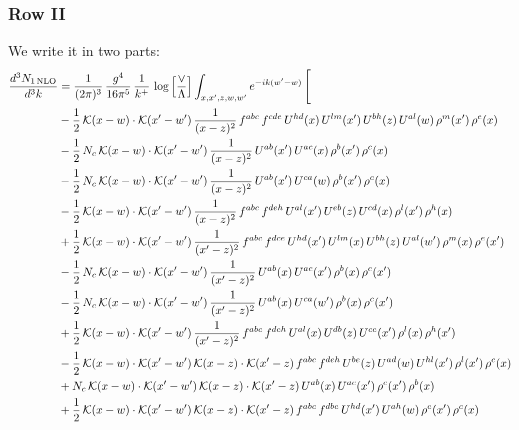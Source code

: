 \documentclass[9pt]{article}
\numberwithin{equation}{section}
\begin{document}
\subsubsection{Row II}
We write it in two parts:
\begin{align}
\frac{d^{3}N_{1\,\mathrm{NLO}}}{d^{3}k} & = \frac{1}{(2\pi)^{3}}\,\frac{g^{4}}{16\pi^{5}}\,\frac{1}{k^{+}}\,\log\Big[\frac{\vee}{\Lambda}\Big]\int_{x,x',z,w,w'}e^{-ik(w'-w)}\,\Bigg[\notag\\ & -\frac{1}{2}\,\mathcal{K}(x-w)\cdot\mathcal{K}(x'-w')\,\frac{1}{(x-z)^{2}}\,f^{abc}\,f^{cde}\,U^{hd}(x)\,U^{lm}(x')\,U^{bh}(z)\,U^{al}(w)\,\rho^{m}(x')\,\rho^{e}(x)\notag\\
& -\frac{1}{2}\,N_{c}\,\mathcal{K}(x-w)\cdot\mathcal{K}(x'-w')\,\frac{1}{(x-z)^{2}}\,U^{ab}(x')\,U^{ac}(x)\,\rho^{b}(x')\,\rho^{c}(x)\notag\\
& -\frac{1}{2}\,N_{c}\,\mathcal{K}(x-w)\cdot\mathcal{K}(x'-w')\,\frac{1}{(x-z)^{2}}\,U^{ab}(x')\,U^{ca}(w)\,\rho^{b}(x')\,\rho^{c}(x)\notag\\
& -\frac{1}{2}\,\mathcal{K}(x-w)\cdot\mathcal{K}(x'-w')\,\frac{1}{(x-z)^{2}}\,f^{abc}\,f^{deh}\,U^{al}(x')\,U^{eb}(z)\,U^{cd}(x)\,\rho^{l}(x')\,\rho^{h}(x)\notag\\
& +\frac{1}{2}\,\mathcal{K}(x-w)\cdot\mathcal{K}(x'-w')\,\frac{1}{(x'-z)^{2}}\,f^{abc}\,f^{dce}\,U^{hd}(x')\,U^{lm}(x)\,U^{bh}(z)\,U^{al}(w')\,\rho^{m}(x)\,\rho^{e}(x')\notag\\
& -\frac{1}{2}\,N_{c}\,\mathcal{K}(x-w)\cdot\mathcal{K}(x'-w')\,\frac{1}{(x'-z)^{2}}\,U^{ab}(x)\,U^{ac}(x')\,\rho^{b}(x)\,\rho^{c}(x')\notag\\
& -\frac{1}{2}\,N_{c}\,\mathcal{K}(x-w)\cdot\mathcal{K}(x'-w')\,\frac{1}{(x'-z)^{2}}\,U^{ab}(x)\,U^{ca}(w')\,\rho^{b}(x)\,\rho^{c}(x')\notag\\
& +\frac{1}{2}\,\mathcal{K}(x-w)\cdot\mathcal{K}(x'-w')\,\frac{1}{(x'-z)^{2}}\,f^{abc}\,f^{deh}\,U^{al}(x)\,U^{db}(z)\,U^{ce}(x')\,\rho^{l}(x)\,\rho^{h}(x')\notag\\
& -\frac{1}{2}\,\mathcal{K}(x-w)\cdot\mathcal{K}(x'-w')\,\mathcal{K}(x-z)\cdot\mathcal{K}(x'-z)\,f^{abc}\,f^{deh}\,U^{be}(z)\,U^{ad}(w)\,U^{hl}(x')\,\rho^{l}(x')\,\rho^{c}(x)\notag\\
& +N_{c}\,\mathcal{K}(x-w)\cdot\mathcal{K}(x'-w')\,\mathcal{K}(x-z)\cdot\mathcal{K}(x'-z)\,U^{ab}(x)\,U^{ac}(x')\,\rho^{c}(x')\,\rho^{b}(x)\notag\\
& +\frac{1}{2}\,\mathcal{K}(x-w)\cdot\mathcal{K}(x'-w')\,\mathcal{K}(x-z)\cdot\mathcal{K}(x'-z)\,f^{abc}\,f^{dbe}\,U^{hd}(x')\,U^{ah}(w)\,\rho^{e}(x')\,\rho^{c}(x)\notag\\

\end{align}
\end{document}
